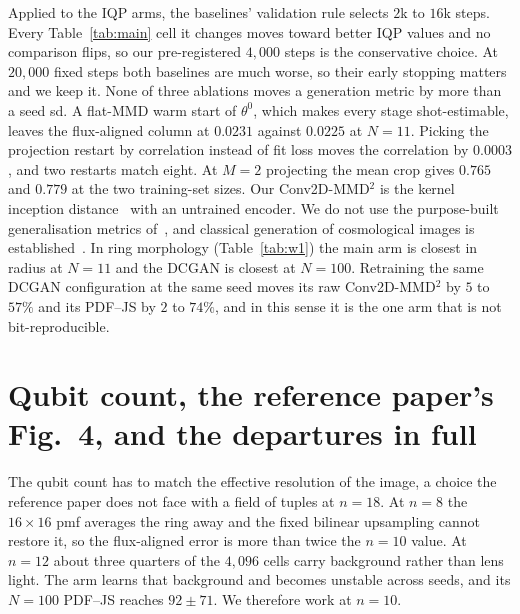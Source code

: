 \documentclass{article}
\begin{document}
Applied to the IQP arms, the baselines' validation rule selects $2$k to $16$k steps. Every
Table~\ref{tab:main} cell it changes moves toward better IQP values and no comparison flips, so our
pre-registered $4{,}000$ steps is the conservative choice. At $20{,}000$ fixed steps both baselines
are much worse, so their early stopping matters and we keep it. None of three ablations moves a
generation metric by more than a seed sd. A flat-MMD warm start of $\theta^{0}$, which makes every
stage shot-estimable, leaves the flux-aligned column at $0.0231$ against $0.0225$ at $N{=}11$.
Picking the projection restart by correlation instead of fit loss moves the correlation by
$0.0003$, and two restarts match eight. At $M{=}2$ projecting the mean crop gives $0.765$ and
$0.779$ at the two training-set sizes. Our Conv2D-MMD$^2$ is the kernel inception
distance~\cite{binkowski_2018_demystifying} with an untrained encoder. We do not use the
purpose-built generalisation metrics of~\cite{gili_2024_generalization}, and classical generation
of cosmological images is established~\cite{mustafa_2019_cosmogan}. In ring morphology
(Table~\ref{tab:w1}) the main arm is closest in radius at $N{=}11$ and the DCGAN is closest at
$N{=}100$. Retraining the same DCGAN configuration at the same seed moves its
raw Conv2D-MMD$^2$ by $5$ to $57\%$ and its PDF--JS by $2$ to $74\%$, and in this sense it is the
one arm that is not bit-reproducible.

\section{\texorpdfstring{Qubit count, the reference paper's Fig.~4, and the departures in full}{Qubit count, the reference paper's Fig. 4, and the departures in full}}
\label{app:nsweep}

The qubit count has to match the effective resolution of the image, a choice the reference paper
does not face with a field of tuples at $n=18$. At $n=8$ the $16\times16$ pmf averages the ring
away and the fixed bilinear upsampling cannot restore it, so the flux-aligned error is more than
twice the $n=10$ value. At $n=12$ about three quarters of the $4{,}096$ cells carry background
rather than lens light. The arm learns that background and becomes unstable across seeds, and its
$N{=}100$ PDF--JS reaches $92 \pm 71$. We therefore work at $n=10$.
\end{document}
